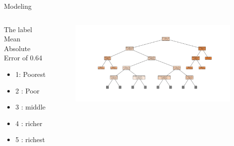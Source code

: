 \documentclass[t]{beamer}
\begin{document}
\begin{frame}{Modeling}
	\begin{columns}[T,totalwidth=\textwidth]
        \begin{column}{0.45\textwidth}
	       \begin{block}{The label}
	        Mean Absolute Error of 0.64
                \begin{itemize}
                    \item 1:  Poorest
                    \item 2 : Poor
                    \item 3 : middle 
                    \item 4 : richer
                    \item 5 : richest
                \end{itemize}
	       \end{block}
	    \end{column}
	    
	    \begin{column}{0.65\textwidth}
			\begin{figure}
				\vspace{-\blocktitlesize}
				\includegraphics[height=0.5\paperheight,keepaspectratio]{images/tree_ohe.png}
			\end{figure}
  		\end{column}
  	\end{columns}
\end{frame}
\end{document}
